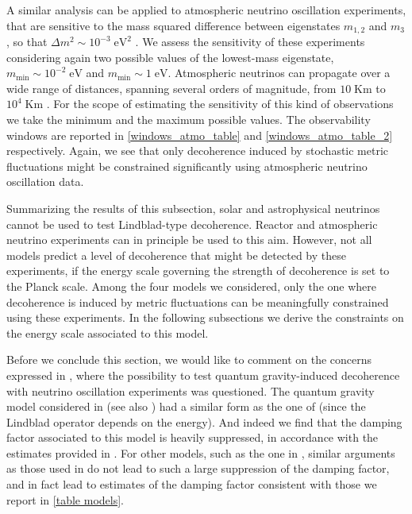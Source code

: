 \documentclass[11pt]{article}
\begin{document}
A similar analysis can be applied to atmospheric neutrino oscillation experiments, that are sensitive to the mass squared difference between eigenstates $m_{1,2}$ and $m_3$, so that $\Delta m^2 \sim 10^{-3}\;\text{eV}^2$ \cite{Super-Kamiokande:2004orf}. We assess the sensitivity of these experiments considering again two possible values of the lowest-mass eigenstate, $m_{\text{min}} \sim 10^{-2}\;\text{eV}$ and $m_{\text{min}}\sim 1\;\text{eV}$. Atmospheric neutrinos can propagate over a wide range of distances, spanning several orders of magnitude, from $10\;\text{Km}$ to $10^4\;\text{Km}$ \cite{Super-Kamiokande:2004orf}. For the scope of estimating the sensitivity of this kind of observations we take the minimum and the maximum possible values. The observability windows are reported in \cref{windows_atmo_table} and \cref{windows_atmo_table_2} respectively. Again, we see that only decoherence induced by stochastic metric fluctuations \cite{Breuer:2008rh} might be constrained significantly using atmospheric neutrino oscillation data. %

Summarizing the results of this subsection, solar and astrophysical neutrinos cannot be used to test Lindblad-type decoherence. Reactor and atmospheric neutrino experiments can in principle be used to this aim. However, not all models predict a level of decoherence that might be detected by these experiments, if the energy scale governing the strength of decoherence is set to the Planck scale. Among the four models we considered, only the one where decoherence is induced by metric fluctuations can be meaningfully constrained using these experiments. In the following subsections we derive the constraints on the energy scale associated to this model.

Before we conclude this section, we would like to comment on the concerns expressed in \cite{Adler:2000vfa}, where the possibility to test quantum gravity-induced decoherence with neutrino oscillation experiments was questioned. The quantum gravity model considered in \cite{Adler:2000vfa} (see also \cite{Lisi:2000zt}) had a similar form as the one of \cite{Petruzziello:2020wkd} (since the Lindblad operator depends on the energy). And indeed we find that the damping factor associated to this model is heavily suppressed, in accordance with the estimates provided in \cite{Adler:2000vfa}. For other models, such as the one in \cite{Breuer:2008rh}, similar arguments as those used in \cite{Adler:2000vfa} do not lead to such a large suppression of the damping factor, and in fact lead to estimates of the damping factor consistent with those we report in \cref{table models}.
\end{document}
